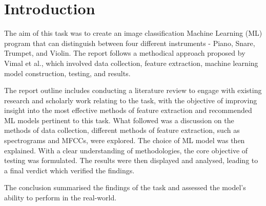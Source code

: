 \section{Introduction}

The aim of this task was to create an image classification Machine Learning (ML) program that can distinguish between four different instruments - Piano, Snare, Trumpet, and Violin. The report follows a methodical approach proposed by Vimal et al., which involved data collection, feature extraction, machine learning model construction, testing, and results.

The report outline includes conducting a literature review to engage with existing research and scholarly work relating to the task, with the objective of improving insight into the most effective methods of feature extraction and recommended ML models pertinent to this task. What followed was a discussion on the methods of data collection, different methods of feature extraction, such as spectrograms and MFCCs, were explored. The choice of ML model was then explained. With a clear understanding of methodologies, the core objective of testing was formulated. The results were then displayed and analysed, leading to a final verdict which verified the findings. 

The conclusion summarised the findings of the task and assessed the model's ability to perform in the real-world.